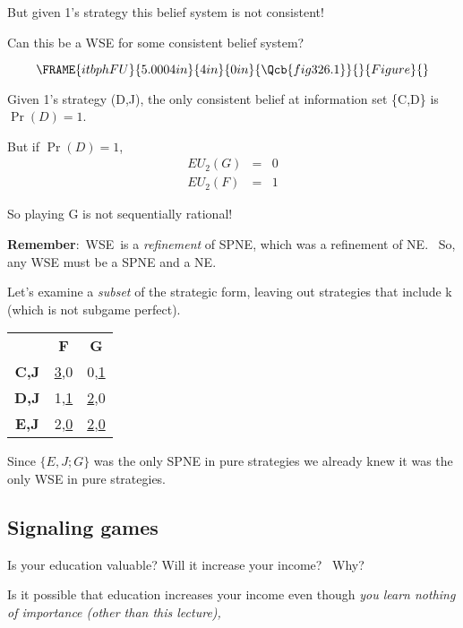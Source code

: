 \documentclass{article}
\begin{document}
But given 1's strategy this belief system is not consistent! \ 

Can this be a WSE for some consistent belief system?

\[
\FRAME{itbphFU}{5.0004in}{4in}{0in}{\Qcb{fig 326.1}}{}{Figure}{\special%
{language "Scientific Word";type "GRAPHIC";maintain-aspect-ratio
TRUE;display "USEDEF";valid_file "T";width 5.0004in;height 4in;depth
0in;original-width 5.3358in;original-height 4.6484in;cropleft "0";croptop
"1";cropright "1";cropbottom "0";tempfilename
'JSH1WT0C.wmf';tempfile-properties "XPR";}} 
\]

Given 1's strategy (D,J), the only consistent belief at information set
\{C,D\} is $\Pr (D)=1$.

But if $\Pr (D)=1$, 
\begin{eqnarray*}
EU_{2}(G) &=&0 \\
EU_{2}(F) &=&1
\end{eqnarray*}

So playing G is not sequentially rational!

\bigskip

\pagebreak

\textbf{Remember}:\ WSE\ is a \textit{refinement }of SPNE, which was a
refinement of NE. \ So, any WSE must be a SPNE and a NE. \ 

Let's examine a \textit{subset} of the strategic form, leaving out
strategies that include k (which is not subgame perfect).

\begin{tabular}{ccc}
& \textbf{F} & \textbf{G} \\ 
\textbf{C,J} & \underline{3},0 & 0,\underline{1} \\ 
\textbf{D,J} & 1,\underline{1} & \underline{2},0 \\ 
\textbf{E,J} & 2,\underline{0} & \underline{2},\underline{0}%
\end{tabular}

Since $\{E,J;G\}$ was the only SPNE in pure strategies we already knew it
was the only WSE in pure strategies.

\subsection{Signaling games}

Is your education valuable? Will it increase your income? \ Why?

\bigskip

Is it possible that education increases your income even though \textit{you
learn nothing of importance (other than this lecture), }
\end{document}
